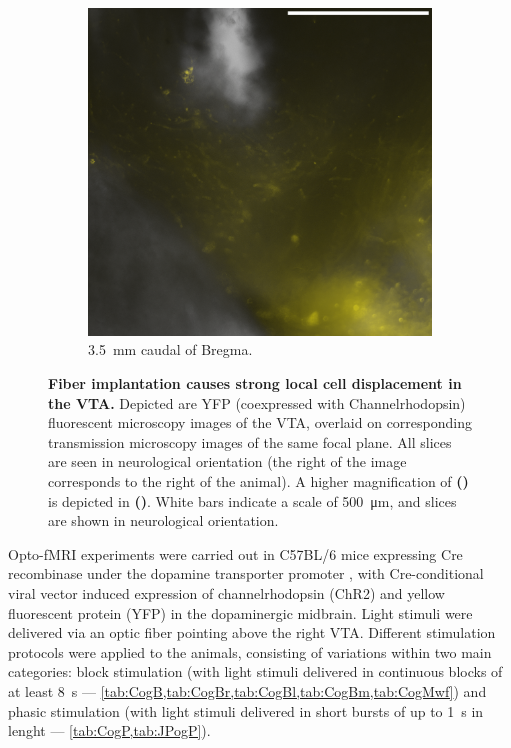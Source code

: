 \begin{figure}[h!]
\begin{subfigure}{.43\textwidth}
		\label{fig:h6589}
	\end{subfigure}
	\begin{subfigure}{.2728\textwidth}
		\centering
		\includegraphics[width=\textwidth]{img/sub-6589_slice-a4_zoom-10_scene-2_transmission-yfp-comb_straight.png}
                \caption{\SI{3.5}{\milli\meter} caudal of Bregma.}
		\label{fig:h6589z}
	\end{subfigure}
        \vspace{-.5em}
	\caption{
		\textbf{Fiber implantation causes strong local cell displacement in the VTA.}
                Depicted are YFP (coexpressed with Channelrhodopsin) fluorescent microscopy images of the VTA, overlaid on corresponding transmission microscopy images of the same focal plane.
                All slices are seen in neurological orientation (the right of the image corresponds to the right of the animal).
                A higher magnification of \textbf{()} is depicted in \textbf{()}.
                White bars indicate a scale of \SI{500}{\micro\meter}, and slices are shown in neurological orientation.
                }
	\label{fig:h}
\end{figure}

Opto-fMRI experiments were carried out in C57BL/6 mice expressing Cre recombinase under the dopamine transporter promoter \cite{dat}, with Cre-conditional viral vector induced expression of channelrhodopsin (ChR2) and yellow fluorescent protein (YFP) in the dopaminergic midbrain.
Light stimuli were delivered via an optic fiber pointing above the right VTA.
Different stimulation protocols were applied to the animals, consisting of variations within two main categories:
block stimulation (with light stimuli delivered in continuous blocks of at least \SI{8}{\second} --- \cref{tab:CogB,tab:CogBr,tab:CogBl,tab:CogBm,tab:CogMwf})
and
phasic stimulation (with light stimuli delivered in short bursts of up to \SI{1}{\second} in lenght --- \cref{tab:CogP,tab:JPogP}).

